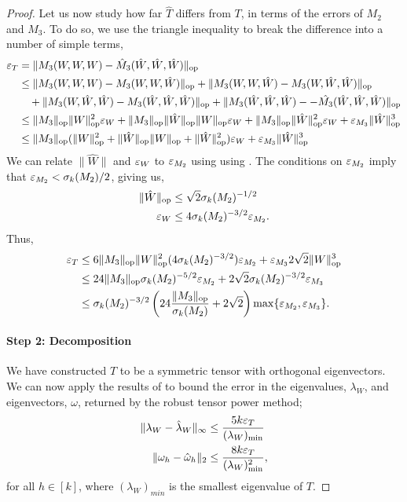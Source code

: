 \begin{proof}
Let us now study how far $\hat T$ differs from $T$, in terms of the
errors of $M_2$ and $M_3$. To do so, we use the triangle inequality to
break the difference into a number of simple terms,
\begin{align*}
  \varepsilon_{T} &= \|M_3(W,W,W) - \hat M_3(\hat W,\hat W, \hat W)\|_{\text{\rm op}} \\
           &\le 
           \| {M_3}(W,W,W) - {M_3}(W,W,\hat W) \|_{\text{\rm op}}
           + \| {M_3}(W,W,\hat W) - {M_3}(W, \hat W, \hat W)\|_{\text{\rm op}} \\
           &\quad 
           + \|{M_3}(W,\hat W,\hat W) - {M_3}(\hat W, \hat W, \hat W)\|_{\text{\rm op}} 
           + \|{M_3}(\hat W,\hat W,\hat W) - - \hat {M_3}(\hat W,\hat W, \hat W)\|_{\text{\rm op}} \\
           &\le
           \| {M_3} \|_{\text{\rm op}} \|W\|^2_{\text{\rm op}} \varepsilon_{W} +
            \| {M_3} \|_{\text{\rm op}} \|\hat W\|_{\text{\rm op}} \|W\|_{\text{\rm op}} \varepsilon_{W} +
            \| {M_3} \|_{\text{\rm op}} \|\hat W\|^2_{\text{\rm op}} \varepsilon_{W} +
            \varepsilon_{M_3} \|\hat W\|^3_{\text{\rm op}}  \\
           &\le
           \| {M_3} \|_{\text{\rm op}} (\|W\|^2_{\text{\rm op}} + \|\hat W\|_{\text{\rm op}} \|W\|_{\text{\rm op}} + \|\hat W\|^2_{\text{\rm op}}) \varepsilon_{W} +
            \varepsilon_{M_3} \|\hat W\|^3_{\text{\rm op}} 
\end{align*}
We can relate $\|\hat W\|$ and $\varepsilon_{W}$ to $\varepsilon_{M_2}$ using using
. The conditions on $\varepsilon_{M_2}$ imply that $\varepsilon_{M_2}
< \sigma_k(M_2)/2$, giving us,
\begin{align*}
  \|\hat W\|_{\text{\rm op}} &\le \sqrt{2} \sigma_k(M_2)^{-1/2} \\
  \varepsilon_{W} &\le 4 \sigma_k(M_2)^{-3/2} \varepsilon_{M_2}.
\end{align*}
Thus,
\begin{align*}
  \varepsilon_{T} &\le 
  6 \| {M_3} \|_{\text{\rm op}} \|W\|^2_{\text{\rm op}} (4 \sigma_k(M_2)^{-3/2}) \varepsilon_{M_2} +
  \varepsilon_{M_3} 2\sqrt{2} \|W\|^3_{\text{\rm op}} \\
  &\le 
  24 \| {M_3} \|_{\text{\rm op}} \sigma_k(M_2)^{-5/2} \varepsilon_{M_2} +
  2\sqrt{2} \sigma_k(M_2)^{-3/2} \varepsilon_{M_3} \\
  &\le 
    \sigma_k(M_2)^{-3/2}
      \left(24 \frac{\| {M_3} \|_{\text{\rm op}}}{\sigma_k(M_2)} + 2\sqrt{2} \right)
      \max\{ \varepsilon_{M_2}, \varepsilon_{M_3} \}.
\end{align*}

\paragraph{Step 2: Decomposition}

We have constructed $T$ to be a symmetric tensor with orthogonal
eigenvectors. We can now apply the results of \citet[Theorem
5.1]{AnandkumarGeHsu2012} to bound the error in the eigenvalues,
$\lambda_W$, and eigenvectors, $\omega$, returned by the robust tensor
power method;
\newcommand{\lW}{\lambda_W}
\newcommand{\lhW}{{\hat\lambda}_W}
\newcommand{\mW}{\omega}
\newcommand{\mhW}{{\hat\omega}}
\begin{align*}
  \|\lW - \lhW \|_{\infty} 
  &\le \frac{5 k \aerr{T}}{(\lW)_{\min}} \\
\|\mW_h -\mhW_h \|_2 
&\le \frac{8 k \aerr{T}}{(\lW)_{\min}^2},
\end{align*}
for all $h \in [k]$, where $(\lW)_{min}$ is the smallest
eigenvalue of $T$. 


\end{proof}
